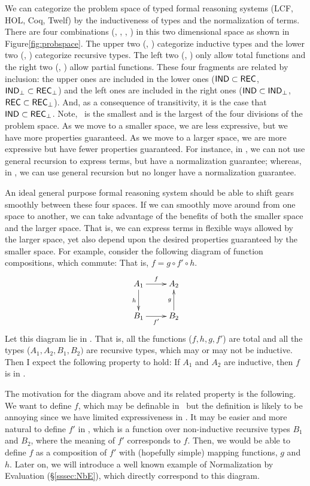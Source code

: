 We can categorize the problem space of typed formal reasoning systems (\eg LCF,
HOL, Coq, Twelf) by the inductiveness of types and the normalization of terms.
There are four combinations (\IND, \INDbot, \REC, \RECbot)
in this two dimensional space as shown in Figure\;\ref{fig:probspace}.
The upper two (\IND, \INDbot) categorize inductive types and
the lower two (\REC, \RECbot) categorize recursive types.
The left two (\IND, \REC) only allow total functions and
the right two (\INDbot, \RECbot) allow partial functions.
These four fragments are related by inclusion: the upper ones are included in
the lower ones ($\mathsf{IND}\subset\mathsf{REC}$, $\mathsf{IND}_\bot\subset\mathsf{REC}_\bot$) and the left ones
are included in the right ones ($\mathsf{IND}\subset\mathsf{IND}_\bot$, $\mathsf{REC}\subset\mathsf{REC}_\bot$).
And, as a consequence of transitivity, it is the case that $\mathsf{IND}\subset\mathsf{REC}_\bot$.
Note, \IND\ is the smallest and \RECbot is the largest of the four divisions
of the problem space. As we move to a smaller space, we are less expressive,
but we have more properties guaranteed. As we move to a larger space, we are
more expressive but have fewer properties guaranteed. For instance, in \IND,
we can not use general recursion to express terms, but have a normalization
guarantee; whereas, in \INDbot, we can use general recursion but no longer
have a normalization guarantee.
 
An ideal general purpose formal reasoning system should be able to shift
gears smoothly between these four spaces. If we can smoothly move around
from one space to another, we can take advantage of the benefits of both
the smaller space and the larger space. That is, we can express terms
in flexible ways allowed by the larger space, yet also depend upon
the desired properties guaranteed by the smaller space. For example,
consider the following diagram of function compositions, which commute:
That is, $f = g \circ f' \circ h$.
\[ \xymatrix{A_1 \ar[r]^f \ar[d]_h & A_2 \\
             B_1 \ar[r]_{f'}       & B_2 \ar[u]^g} \]
Let this diagram lie in \REC. That is,
all the functions ($f,h,g,f'$) are total and all the types ($A_1,A_2,B_1,B_2)$
are recursive types, which may or may not be inductive.
Then I expect the following property to hold:
If $A_1$ and $A_2$ are inductive, then $f$ is in \IND.

The motivation for the diagram above and its related property is the following.
We want to define $f$, which may be definable in \IND\ but the definition
is likely to be annoying since we have limited expressiveness in \IND.
It may be easier and more natural to define $f'$ in \REC, which is a function
over non-inductive recursive types $B_1$ and $B_2$, where the meaning of $f'$
corresponds to $f$. Then, we would be able to define $f$ as a composition of
$f'$ with (hopefully simple) mapping functions, $g$ and $h$. Later on,
we will introduce a well known example of Normalization by Evaluation
(\S\ref{sssec:NbE}), which directly correspond to this diagram.

